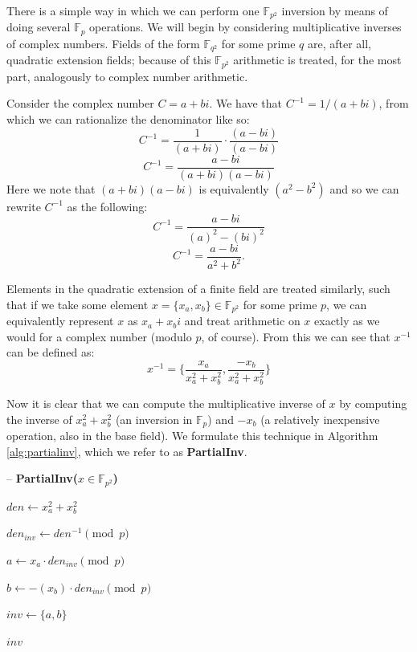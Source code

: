 There is a simple way in which we can perform one $\mathbb{F}_{p^{2}}$ inversion by means of doing several $\mathbb{F}_{p}$ operations. We will begin by considering multiplicative inverses of complex numbers. Fields of the form $\mathbb{F}_{q^{2}}$ for some prime $q$ are, after all, quadratic extension fields; because of this $\mathbb{F}_{p^{2}}$ arithmetic is treated, for the most part, analogously to complex number arithmetic.

Consider the complex number $C = a + bi$. We have that $C^{-1} = 1 / (a + bi)$, from which we can rationalize the denominator like so:\\
$$
C^{-1} = \frac {1}{(a + bi)} \cdot \frac{(a - bi)}{(a - bi)}
$$
$$
C^{-1} = \frac {a - bi}{(a + bi)(a - bi)}
$$
Here we note that $(a + bi)(a - bi)$ is equivalently $(a^2 - b^2)$ and so we can rewrite $C^{-1}$ as the following:
$$
C^{-1} = \frac {a - bi}{(a)^2 - (bi)^2}
$$
$$
C^{-1} = \frac {a - bi}{a^2 + b^2}.
$$

Elements in the quadratic extension of a finite field are treated similarly, such that if we take some element $x = \{x_{a}, x_{b}\} \in \mathbb{F}_{p^{2}}$ for some prime $p$, we can equivalently represent $x$ as $x_{a} + x_{b}i$ and treat arithmetic on $x$ exactly as we would for a complex number (modulo $p$, of course). From this we can see that $x^{-1}$ can be defined as:
$$
x^{-1} = \{\frac {x_{a}}{x_{a}^2 + x_{b}^2}, \frac {-x_{b}}{x_{a}^2 + x_{b}^2}\}
$$

Now it is clear that we can compute the multiplicative inverse of $x$ by computing the inverse of $x_{a}^2 + x_{b}^2$ (an inversion in $\mathbb{F}_{p}$) and $-x_{b}$ (a relatively inexpensive operation, also in the base field). We formulate this technique in Algorithm \ref{alg:partialinv}, which we refer to as \textbf{PartialInv}.\\

\begin{algorithm}[!h]
\caption{-- \textbf{PartialInv($x \in \mathbb{F}_{p^{2}}$)}}\label{alg:partialinv}
\begin{algorithmic}[1]
\State $den \gets x_{a}^{2} + x_{b}^{2}$

\State $den_{inv} \gets den^{-1} \pmod{p}$

\State $a \gets x_{a} \cdot den_{inv} \pmod{p}$

\State $b \gets -(x_{b}) \cdot den_{inv} \pmod{p}$

\State $inv \gets \{a, b\}$

\State \Return $inv$
\end{algorithmic}
\end{algorithm}

